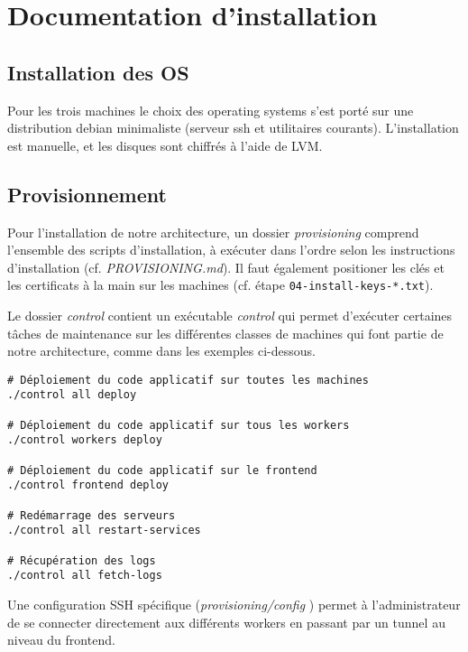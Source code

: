 \newpage

\chapter{Documentation d'installation}

\section{Installation des OS}

Pour les trois machines le choix des operating systems s'est porté sur une distribution debian minimaliste (serveur ssh et utilitaires courants). L'installation est manuelle, et les disques sont chiffrés à l'aide de LVM.

\section{Provisionnement}

Pour l'installation de notre architecture, un dossier {\it provisioning} comprend l'ensemble des scripts d'installation,
à exécuter dans l'ordre selon les instructions d'installation (cf. {\it PROVISIONING.md}). Il faut également positioner
les clés et les certificats à la main sur les machines (cf. étape {\tt 04-install-keys-*.txt}).

Le dossier {\it control} contient un exécutable {\it control} qui permet d'exécuter certaines tâches de maintenance sur
les différentes classes de machines qui font partie de notre architecture, comme dans les exemples ci-dessous. 

\begin{verbatim}
# Déploiement du code applicatif sur toutes les machines
./control all deploy

# Déploiement du code applicatif sur tous les workers
./control workers deploy

# Déploiement du code applicatif sur le frontend
./control frontend deploy

# Redémarrage des serveurs
./control all restart-services

# Récupération des logs
./control all fetch-logs
\end{verbatim}

Une configuration SSH spécifique ({\it provisioning/config }) permet à l'administrateur de se connecter directement aux
différents workers en passant par un tunnel au niveau du frontend.
